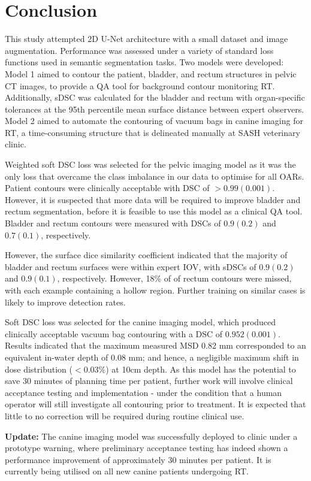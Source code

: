 \chapter{Conclusion}
\label{ch:conclusion}

This study attempted 2D U-Net architecture with a small dataset and image
augmentation. Performance was assessed under a variety of standard loss
functions used in semantic segmentation tasks. Two models were developed: Model
1 aimed to contour the patient, bladder, and rectum structures in pelvic CT
images, to provide a QA tool for background contour monitoring RT. Additionally,
sDSC was calculated for the bladder and rectum with organ-specific tolerances at
the 95th percentile mean surface distance between expert observers. Model 2
aimed to automate the contouring of vacuum bags in canine imaging for RT, a
time-consuming structure that is delineated manually at SASH veterinary clinic.

Weighted soft DSC loss was selected for the pelvic imaging model as it was the
only loss that overcame the class imbalance in our data to optimise for all
OARs. Patient contours were clinically acceptable with DSC of $>0.99(0.001)$.
However, it is suspected that more data will be required to improve bladder and
rectum segmentation, before it is feasible to use this model as a clinical QA
tool. Bladder and rectum contours were measured with DSCs of $0.9(0.2)$ and
$0.7(0.1)$, respectively.

However, the surface dice similarity coefficient indicated that the majority of
bladder and rectum surfaces were within expert IOV, with sDSCs of $0.9(0.2)$ and
$0.9(0.1)$, respectively. However, 18\% of of rectum contours were missed, with each
example containing a hollow region. Further training on similar cases is likely
to improve detection rates.

Soft DSC loss was selected for the canine imaging model, which produced
clinically acceptable vacuum bag contouring with a DSC of $0.952(0.001)$. Results
indicated that the maximum measured MSD 0.82 mm corresponded to an equivalent
in-water depth of 0.08 mm; and hence, a negligible maximum shift in dose
distribution ($<0.03\%$) at 10cm depth. As this model has the potential to save
30 minutes of planning time per patient, further work will involve clinical
acceptance testing and implementation - under the condition that a human
operator will still investigate all contouring prior to treatment. It is
expected that little to no correction will be required during routine clinical
use.

\textbf{Update:} The canine imaging model was successfully deployed to clinic
under a prototype warning, where preliminary acceptance testing has indeed shown
a performance improvement of approximately 30 minutes per patient. It is
currently being utilised on all new canine patients undergoing RT.